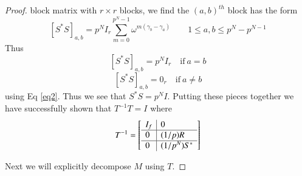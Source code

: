 \documentclass[preprint,12pt]{elsarticle}
\theoremstyle{definition}
\theoremstyle{remark}
\begin{document}
\begin{proof}
block matrix with $r\times r$ blocks, we find the $ (a,b)^{th} $ block has the form $$ \left[ S^*S\right]_{a,b}=p^NI_r\sum\limits_{m=0}^{p^{N}-1}\omega^{m(\gamma_b-\gamma_a)} \qquad 1\leq a,b \leq p^N-p^{N-1} $$
Thus $$ \left[ S^*S\right]_{a,b}=p^NI_r \quad \text{if} \ a=b$$
$$ \left[ S^*S\right]_{a,b}=0_r \quad \text{if} \ a \neq b$$
using Eq \ref{eq2}. Thus we see that $S^*S=p^N I$.  Putting these pieces together we have successfully shown that $T^{-1}T=I$ where $$T^{-1}=\left[\begin{array}{l | l  }
I_f & 0 \\\hline
0 & (1/p)R \\\hline
 0 & (1/p^N)S^*   \\
\end{array}\right]$$

Next we will explicitly decompose $M$ using $T$.


\end{proof}
\end{document}
